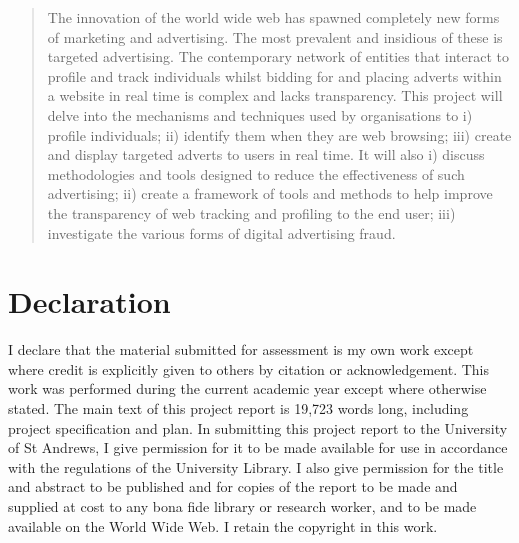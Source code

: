 \documentclass[12pt]{article}
\begin{document}
\pagestyle{plain}
\begin{abstract}
The innovation of the world wide web has spawned completely new forms of marketing and advertising. The most prevalent and insidious of these  is targeted advertising. The contemporary network of entities that interact to profile and track individuals whilst  bidding for and placing adverts within a website in real time is complex and lacks transparency. This project will delve into the mechanisms and techniques used by organisations to i) profile individuals; ii) identify them when they are web browsing; iii) create and display targeted adverts to users in real time. It will also i) discuss methodologies and tools designed to reduce the effectiveness of such advertising;  ii) create a framework of tools and methods to help improve the transparency of web tracking and profiling to the end user; iii) investigate the various forms of digital advertising fraud.  
\end{abstract}

\section{Declaration}
I declare that the material submitted for assessment is my own work except where credit is explicitly
given to others by citation or acknowledgement. This work was performed during the current academic year
except where otherwise stated. The main text of this project report is 19,723 words long,
including project specification and plan. In submitting this project report to the University of St
Andrews, I give permission for it to be made available for use in accordance with the regulations of the
University Library. I also give permission for the title and abstract to be published and for copies of the report to be made and supplied at cost to any bona fide library or research worker, and to be made available on the World Wide Web. I retain the copyright in this work.

\pagebreak

\tableofcontents

\pagebreak

\pagestyle{fancy}
\end{document}
